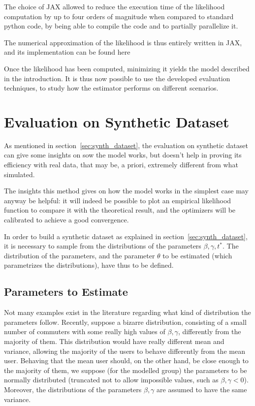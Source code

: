 The choice of JAX allowed to reduce the execution time of the likelihood computation by up to four orders of magnitude when compared to standard python code,
by being able to compile the code and to partially parallelize it.

The numerical approximation of the likelihood is thus entirely written in JAX,
and its implementation can be found here

Once the likelihood has been computed,
minimizing it yields the model described in the introduction.
It is thus now possible to use the developed evaluation techniques,
to study how the estimator performs on different scenarios.

\section{Evaluation on Synthetic Dataset}
\label{sec:eval_synth_dataset}

As mentioned in section~\ref{sec:synth_dataset},
the evaluation on synthetic dataset can give some insights on sow the model works,
but doesn't help in proving its efficiency with real data,
that may be, a priori, extremely different from what simulated.

The insights this method gives on how the model works in the simplest case may anyway be helpful:
it will indeed be possible to plot an empirical likelihood function to compare it with the theoretical result,
and the optimizers will be calibrated to achieve a good convergence.

In order to build a synthetic dataset as explained in section~\ref{sec:synth_dataset},
it is necessary to sample from the distributions of the parameters \(\beta, \gamma, t^*\).
The distribution of the parameters,
and the parameter \(\theta\) to be estimated (which parametrizes the distributions),
have thus to be defined.

\subsection{Parameters to Estimate}

Not many examples exist in the literature regarding what kind of distribution the parameters follow.
Recently, \textcite{https://doi.org/10.1111/iere.12692} suppose a bizarre distribution,
consisting of a small number of commuters with some really high values of \(\beta, \gamma\),
differently from the majority of them.
This distribution would have really different mean and variance,
allowing the majority of the users to behave differently from the mean user.
Behaving that the mean user should, on the other hand,
be close enough to the majority of them, we suppose
(for the modelled group) the parameters to be normally distributed
(truncated not to allow impossible values, such as \(\beta, \gamma < 0\)).
Moreover, the distributions of the parameters \(\beta, \gamma\) are assumed to have the same variance.


